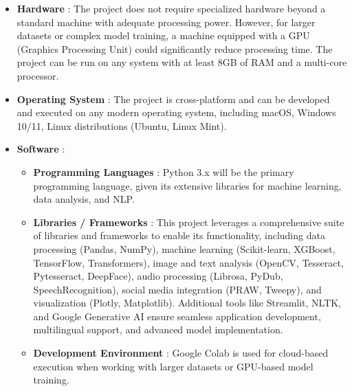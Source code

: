\begin{itemize}
    
    \item \textbf{Hardware} : 
    \noindent
    The project does not require specialized hardware beyond a standard machine with adequate processing power. However, for larger datasets or complex model training, a machine equipped with a GPU (Graphics Processing Unit) could significantly reduce processing time. The project can be run on any system with at least 8GB of RAM and a multi-core processor.

    \item \textbf{Operating System} : 
    \noindent
    The project is cross-platform and can be developed and executed on any modern operating system, including macOS, Windows 10/11, Linux distributions (Ubuntu, Linux Mint). 

    \item  \textbf{Software} :
    \noindent
        \begin{itemize}
            \item \textbf{Programming Languages} : 
            \noindent
            Python 3.x will be the primary programming language, given its extensive libraries for machine learning, data analysis, and NLP.

            \item \textbf{Libraries / Frameworks} :
            \noindent
            This project leverages a comprehensive suite of libraries and frameworks to enable its functionality, including data processing (Pandas, NumPy), machine learning (Scikit-learn, XGBoost, TensorFlow, Transformers), image and text analysis (OpenCV, Tesseract, Pytesseract, DeepFace), audio processing (Librosa, PyDub, SpeechRecognition), social media integration (PRAW, Tweepy), and visualization (Plotly, Matplotlib). Additional tools like Streamlit, NLTK, and Google Generative AI ensure seamless application development, multilingual support, and advanced model implementation.    

            \item \textbf{Development Environment} :
            \noindent
            Google Colab is used for cloud-based execution when working with larger datasets or GPU-based model training.
                

                
        \end{itemize}
    
\end{itemize}

